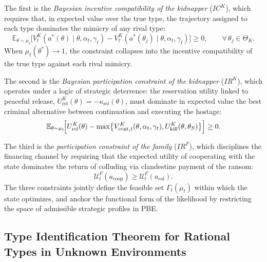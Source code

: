 \documentclass[review,authoryear,12pt]{elsarticle}
\theoremstyle{plain}
\theoremstyle{definition}
\newcommand{\E}{\mathbb{E}}
\newcommand{\ThetaK}{\Theta_K}
\newcommand{\1}{\mathbf{1}}
\begin{document}
The first is the \emph{Bayesian incentive compatibility of the kidnapper} ($IC^K$), which requires that, in expected value over the true type, the trajectory assigned to each type dominates the mimicry of any rival type:
\begin{equation}
\E_{\theta\sim\mu_t}\!\bigl[V^K_t(a^\ast(\theta)\mid\theta,\alpha_t,\gamma_t)-V^K_t(a^\ast(\theta_j)\mid\theta,\alpha_t,\gamma_t)\bigr]\ge 0,\qquad\forall\,\theta_j\in\ThetaK.
\label{eq:ic-kidnapper}
\end{equation}
When $\mu_t(\theta^\ast)\to 1$, the constraint collapses into the incentive compatibility of the true type against each rival mimicry.

The second is the \emph{Bayesian participation constraint of the kidnapper} ($IR^K$), which operates under a logic of strategic deterrence: the reservation utility linked to peaceful release, $U^K_{\mathrm{rel}}(\theta)=-\kappa_{\mathrm{rel}}(\theta)$, must dominate in expected value the best criminal alternative between continuation and executing the hostage:
\begin{equation}
\E_{\theta\sim\mu_t}\!\Bigl[U^K_{\mathrm{rel}}(\theta)-\max\bigl\{V^K_{\mathrm{cont},t}(\theta,\alpha_t,\gamma_t),U^K_{\mathrm{kill}}(\theta,\theta_S)\bigr\}\Bigr]\ge 0.
\label{eq:ir-K}
\end{equation}

The third is the \emph{participation constraint of the family} ($IR^F$), which disciplines the financing channel by requiring that the expected utility of cooperating with the state dominates the return of colluding via clandestine payment of the ransom:
\begin{equation}
\mathcal{U}^F_t(a_{\mathrm{coop}})\ge\mathcal{U}^F_t(a_{\mathrm{col}}).
\label{eq:ir-family}
\end{equation}
The three constraints jointly define the feasible set $\Gamma_t(\mu_t)$ within which the state optimizes, and anchor the functional form of the likelihood by restricting the space of admissible strategic profiles in PBE.

\subsection{Type Identification Theorem for Rational Types in Unknown Environments}\label{subsec:formal-defs}
\end{document}
